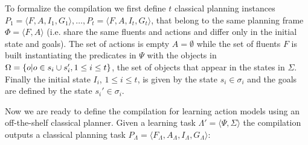 \documentclass[letterpaper]{article} %
\newcommand{\tup}[1]{{\langle #1 \rangle}}
\begin{document}
To formalize the compilation we first define $t$ classical planning instances $P_1=\tup{F,A,I_1,G_1},\ldots,P_t=\tup{F,A,I_t,G_t}$, that belong to the same planning frame $\Phi=\tup{F,A}$ (i.e. share the same fluents and actions and differ only in the initial state and goals). The set of actions is empty $A=\emptyset$ while the set of fluents $F$ is built instantiating the predicates in $\Psi$ with the objects in $\Omega=\{o|o\in s_i\cup s_i', {\small 1\leq i\leq t}\}$, the set of objects that appear in the states in $\Sigma$. Finally the initial state $I_i$, {\small $1\leq i\leq t$}, is given by the state $s_i\in \sigma_i$ and the goals are defined by the state $s_i'\in \sigma_i$. 

Now we are ready to define the compilation for learning action models using an off-the-shelf classical planner. Given a learning task $\Lambda'=\tup{\Psi,\Sigma}$ the compilation outputs a classical planning task $P_{\Lambda}=\tup{F_{\Lambda},A_{\Lambda},I_{\Lambda},G_{\Lambda}}$:
\end{document}
